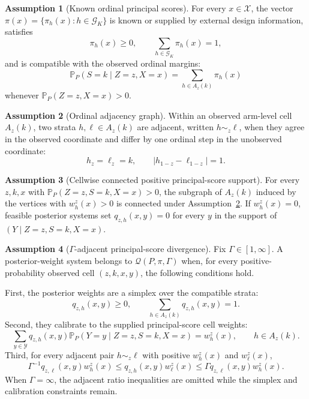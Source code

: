 \documentclass[11pt]{article}
\renewcommand{\Pr}{\mathbb{P}}
\theoremstyle{definition}
\newtheorem{assumption}{Assumption}
\theoremstyle{plain}
\theoremstyle{remark}
\begin{document}
\begin{assumption}[Known ordinal principal scores]\label{ass:principal-scores}
For every \(x\in\mathcal X\), the vector
\(\pi(x)=\{\pi_h(x):h\in\mathcal G_K\}\) is known or supplied by external
design information, satisfies
\[
  \pi_h(x)\ge0,\qquad \sum_{h\in\mathcal G_K}\pi_h(x)=1,
\]
and is compatible with the observed ordinal margins:
\[
  \Pr_P(S=k\mid Z=z,X=x)
  =
  \sum_{h\in A_z(k)}\pi_h(x)
\]
whenever \(\Pr_P(Z=z,X=x)>0\).
\end{assumption}

\begin{assumption}[Ordinal adjacency graph]\label{ass:adjacency}
Within an observed arm-level cell \(A_z(k)\), two strata \(h,\ell\in A_z(k)\)
are adjacent, written \(h\sim_z \ell\), when they agree in the observed
coordinate and differ by one ordinal step in the unobserved coordinate:
\[
  h_z=\ell_z=k,\qquad |h_{1-z}-\ell_{1-z}|=1.
\]
\end{assumption}

\begin{assumption}[Cellwise connected positive principal-score support]\label{ass:connected-support}
For every \(z,k,x\) with \(\Pr_P(Z=z,S=k,X=x)>0\), the subgraph of \(A_z(k)\)
induced by the vertices with \(w^z_h(x)>0\) is connected under
Assumption~\ref{ass:adjacency}.  If \(w^z_h(x)=0\), feasible posterior systems
set \(q_{z,h}(x,y)=0\) for every \(y\) in the support of
\((Y\mid Z=z,S=k,X=x)\).
\end{assumption}

\begin{assumption}[\(\Gamma\)-adjacent principal-score divergence]\label{ass:divergence}
Fix \(\Gamma\in[1,\infty]\).  A posterior-weight system belongs to
\(\mathcal Q(P,\pi,\Gamma)\) when, for every positive-probability observed cell
\((z,k,x,y)\), the following conditions hold.

First, the posterior weights are a simplex over the compatible strata:
\[
  q_{z,h}(x,y)\ge0,\qquad
  \sum_{h\in A_z(k)}q_{z,h}(x,y)=1.
\]
Second, they calibrate to the supplied principal-score cell weights:
\[
  \sum_{y\in\mathcal Y}
  q_{z,h}(x,y)
  \Pr_P(Y=y\mid Z=z,S=k,X=x)
  =
  w^z_h(x),
  \qquad h\in A_z(k).
\]
Third, for every adjacent pair \(h\sim_z\ell\) with positive
\(w^z_h(x)\) and \(w^z_\ell(x)\),
\[
  \Gamma^{-1} q_{z,\ell}(x,y)w^z_h(x)
  \le
  q_{z,h}(x,y)w^z_\ell(x)
  \le
  \Gamma q_{z,\ell}(x,y)w^z_h(x).
\]
When \(\Gamma=\infty\), the adjacent ratio inequalities are omitted while the
simplex and calibration constraints remain.
\end{assumption}
\end{document}
